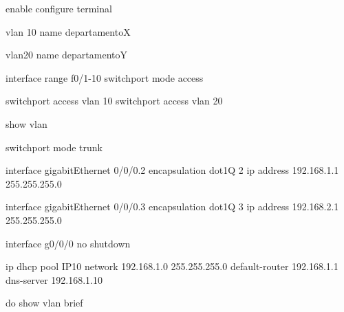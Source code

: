 enable
configure terminal

vlan 10
name departamentoX

vlan20
name departamentoY

interface range f0/1-10
switchport mode access

switchport access vlan 10
switchport access vlan 20

show vlan

switchport mode trunk

interface gigabitEthernet 0/0/0.2
encapsulation dot1Q 2
ip address 192.168.1.1 255.255.255.0

interface gigabitEthernet 0/0/0.3
encapsulation dot1Q 3
ip address 192.168.2.1 255.255.255.0

interface g0/0/0
no shutdown

ip dhcp pool IP10
network 192.168.1.0 255.255.255.0
default-router 192.168.1.1
dns-server 192.168.1.10

do show vlan brief